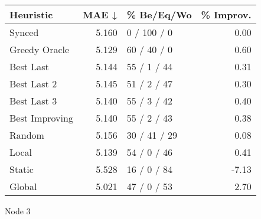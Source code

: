 \begin{tabular}{lrlr}
\toprule
\textbf{Heuristic} & \textbf{MAE ↓} & \textbf{\% Be/Eq/Wo} & \textbf{\% Improv.} \\
\midrule
            Synced &          5.160 &          0 / 100 / 0 &                0.00 \\
     Greedy Oracle &          5.129 &          60 / 40 / 0 &                0.60 \\
         Best Last &          5.144 &          55 / 1 / 44 &                0.31 \\
       Best Last 2 &          5.145 &          51 / 2 / 47 &                0.30 \\
       Best Last 3 &          5.140 &          55 / 3 / 42 &                0.40 \\
    Best Improving &          5.140 &          55 / 2 / 43 &                0.38 \\
            Random &          5.156 &         30 / 41 / 29 &                0.08 \\
             Local &          5.139 &          54 / 0 / 46 &                0.41 \\
            Static &          5.528 &          16 / 0 / 84 &               -7.13 \\
            Global &          5.021 &          47 / 0 / 53 &                2.70 \\
\bottomrule
\end{tabular}
\caption{Node 3}
\label{tab:ds_iid_lr01_le1_bs4_3}

